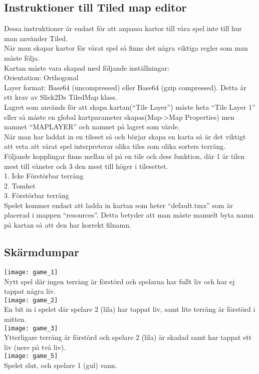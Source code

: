 \subsection{Instruktioner till Tiled map editor}
Dessa instruktioner är endast för att anpassa kartor till våra spel inte till hur man använder Tiled.\\
När man skapar kartor för vårat spel så finns det några viktiga regler som man måste följa.\\
Kartan måste vara skapad med följande inställningar:\\
Orientation: Orthogonal\\
Layer format: Base64 (uncompressed) eller Base64 (gzip compressed). Detta är ett krav av Slick2Ds TiledMap klass.\\
\vspace{11pt}
Lagret som används för att skapa kartan(``Tile Layer'') måste heta ``Tile Layer 1'' eller så måste en global kartparameter skapas(Map->Map Properties) men namnet ``MAPLAYER'' och namnet på lagret som värde.\\
\vspace{11pt}
När man har laddat in en tileset så och börjar skapa en karta så är det viktigt att veta att vårat spel interpreterar olika tiles som olika sorters terräng.\\
\vspace{11pt}
Följande kopplingar finns mellan id på en tile och dess funktion, där 1 är tilen mest till vänster och 3 den mest till höger i tilesettet.\\
1. Icke Förstörbar terräng\\
2. Tomhet\\
3. Förstörbar terräng\\
\vspace{11pt}
Spelet kommer endast att ladda in kartan som heter ``default.tmx'' som är placerad i mappen ``resources''. Detta betyder att man måste manuelt byta namn på kartan så att den har korrekt filnamn.\\
\subsection{Skärmdumpar}
\texttt{[image: game\_1]}\\
Nytt spel där ingen terräng är förstörd och spelarna har fullt liv och har ej tappat några liv.\\
\vspace{11pt}
\texttt{[image: game\_2]}\\
En bit in i spelet där spelare 2 (lila) har tappat liv, samt lite terräng är förstörd i mitten.\\
\vspace{11pt}
\texttt{[image: game\_3]}\\
Ytterligare terräng är förstörd och spelare 2 (lila) är skadad samt har tappat ett liv (nere på två liv).\\
\vspace{11pt}
\texttt{[image: game\_5]}\\
Spelet slut, och spelare 1 (gul) vann.\\
